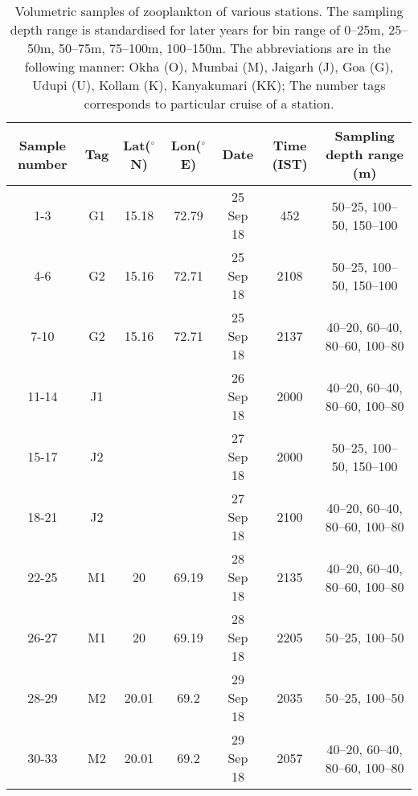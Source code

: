 \documentclass{article}
\begin{document}
\begin{table}[htbp]
	
	{\footnotesize
		\captionsetup{justification=justified,font=footnotesize,skip=0.05\baselineskip,width=\textwidth} %
		\caption{\newline Volumetric samples of zooplankton of various stations. The sampling depth range is standardised for later years for bin range of 0--25m, 25--50m, 50--75m, 75--100m, 100--150m. The abbreviations are in the following manner: Okha (O), Mumbai (M), Jaigarh (J), Goa (G), Udupi (U), Kollam (K), Kanyakumari (KK); The number tags corresponds to particular cruise of a station.}
		\begin{adjustwidth}{0in}{0in} 
			\begin{tabular}{ccccccc}
				\toprule
				Sample number & Tag & Lat($^{\circ}$N)    & Lon($^{\circ}$E)   & Date & Time (IST) & Sampling depth range (m)      \\
				\midrule
				1-3         & G1  & 15.18      & 72.79      & 25 Sep 18                 & 452        & 50–25, 100–50, 150–100        \\
				4-6         & G2  & 15.16      & 72.71      & 25 Sep 18                 & 2108       & 50–25, 100–50, 150–100        \\
				7-10        & G2  & 15.16      & 72.71      & 25 Sep 18                 & 2137       & 40–20, 60–40, 80–60, 100–80   \\
				11-14       & J1  &            &            & 26 Sep 18                 & 2000       & 40–20, 60–40, 80–60, 100–80   \\
				15-17       & J2  &            &            & 27 Sep 18                 & 2000       & 50–25, 100–50, 150–100        \\
				18-21       & J2  &            &            & 27 Sep 18                 & 2100       & 40–20, 60–40, 80–60, 100–80   \\
				22-25       & M1  & 20         & 69.19      & 28 Sep 18                 & 2135       & 40–20, 60–40, 80–60, 100–80   \\
				26-27       & M1  & 20         & 69.19      & 28 Sep 18                 & 2205       & 50–25, 100–50                 \\
				28-29       & M2  & 20.01      & 69.2       & 29 Sep 18                 & 2035       & 50–25, 100–50                 \\
				30-33       & M2  & 20.01      & 69.2       & 29 Sep 18                 & 2057       & 40–20, 60–40, 80–60, 100–80   \\

\end{tabular}
\end{adjustwidth}}
\end{table}
\end{document}
